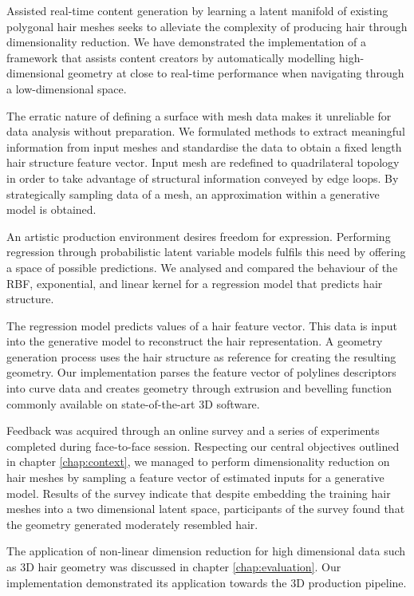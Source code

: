 \documentclass[ %
author={Dillon Keith Diep},
supervisor={Dr. Carl Henrik Ek},
degree={MEng},
title={ART-CG Hair:},
subtitle={Assisted Real-time Content Generation of Stylised Virtual Hair},
type={Research},
year={2017} ]{dissertation}
\begin{document}
Assisted real-time content generation by learning a latent manifold of existing polygonal hair meshes seeks to alleviate the complexity of producing hair through dimensionality reduction.
We have demonstrated the implementation of a framework that assists content creators by automatically modelling high-dimensional geometry at close to real-time performance when navigating through a low-dimensional space.

The erratic nature of defining a surface with mesh data makes it unreliable for data analysis without preparation. We formulated methods to extract meaningful information from input meshes and standardise the data to obtain a fixed length hair structure feature vector. Input mesh are redefined to quadrilateral topology in order to take advantage of structural information conveyed by edge loops. 
By strategically sampling data of a mesh, an approximation within a generative model is obtained.

An artistic production environment desires freedom for expression. Performing regression through probabilistic latent variable models fulfils this need by offering a space of possible predictions. We analysed and compared the behaviour of the RBF, exponential, and linear kernel for a regression model that predicts hair structure.

The regression model predicts values of a hair feature vector. This data is input into the generative model to reconstruct the hair representation. A geometry generation process uses the hair structure as reference for creating the resulting geometry. Our implementation parses the feature vector of polylines descriptors into curve data and creates geometry through extrusion and bevelling function commonly available on state-of-the-art 3D software.

Feedback was acquired through an online survey and a series of experiments completed during face-to-face session. 
Respecting our central objectives outlined in chapter \ref{chap:context}, we managed to perform dimensionality reduction on hair meshes by sampling a feature vector of estimated inputs for a generative model. Results of the survey indicate that despite embedding the training hair meshes into a two dimensional latent space, participants of the survey found that the geometry generated moderately resembled hair.

The application of non-linear dimension reduction for high dimensional data such as 3D hair geometry was discussed in chapter \ref{chap:evaluation}. Our implementation demonstrated its application towards the 3D production pipeline.
\end{document}
